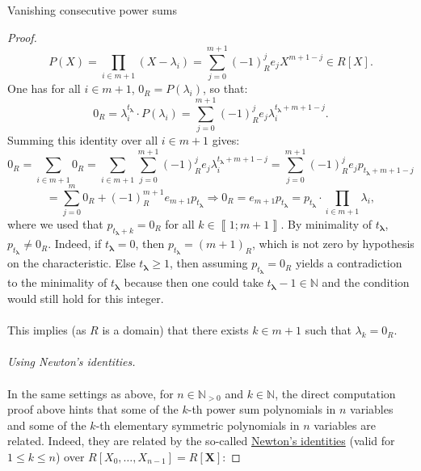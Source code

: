 \begin{appendixitem}{Vanishing consecutive power sums}
\begin{proof}
        \[
            P\left(X\right) = \prod_{i \in m+1} \left(X - \lambda_i\right) = \sum_{j=0}^{m+1} \left(-1\right)_R^j e_j X^{m+1-j} \in R\left[X\right].
        \]
        One has for all \( i \in m+1 \), \( 0_{R} = P\left(\lambda_i\right) \), so that:
        \[
            0_{R} = \lambda_i^{t_{\boldsymbol{\lambda}}} \cdot P\left(\lambda_i\right) = \sum_{j=0}^{m+1} \left(-1\right)_R^j e_j \lambda_i^{t_{\boldsymbol{\lambda}}+m+1-j}.
        \]
        Summing this identity over all \( i \in m+1 \) gives:
        \[
            0_{R} = \sum_{i \in m+1} 0_{R} = \sum_{i \in m+1}\sum_{j=0}^{m+1} \left(-1\right)_R^j e_j \lambda_i^{t_{\boldsymbol{\lambda}}+m+1-j} = \sum_{j=0}^{m+1} \left(-1\right)_R^j e_j p_{t_{\boldsymbol{\lambda}}+m+1-j}
        \]
        \[
            = \sum_{j=0}^{m} 0_{R} + \left(-1\right)_R^{m+1} e_{m+1} p_{t_{\boldsymbol{\lambda}}} \Rightarrow 0_{R} = e_{m+1} p_{t_{\boldsymbol{\lambda}}} = p_{t_{\boldsymbol{\lambda}}} \cdot \prod_{i \in m+1} \lambda_i,
        \]
        where we used that \( p_{t_{\boldsymbol{\lambda}}+k} = 0_{R} \) for all \( k \in \left\llbracket 1;m+1 \right\rrbracket \). By minimality of \( t_{\boldsymbol{\lambda}} \), \( p_{t_{\boldsymbol{\lambda}}} \neq 0_{R} \). Indeed, if \( t_{\boldsymbol{\lambda}} = 0 \), then \( p_{t_{\boldsymbol{\lambda}}} = \left(m+1\right)_{R} \), which is not zero by hypothesis on the characteristic. Else \( t_{\boldsymbol{\lambda}} \geq 1 \), then assuming \( p_{t_{\boldsymbol{\lambda}}} = 0_{R} \) yields a contradiction to the minimality of \( t_{\boldsymbol{\lambda}} \) because then one could take \( t_{\boldsymbol{\lambda}}-1 \in \mathbb{N} \) and the condition would still hold for this integer.
        \\\\
        This implies (as \( R \) is a domain) that there exists \( k \in m+1 \) such that \( \lambda_k = 0_{R} \).
        \\\\
        \textit{Using Newton's identities.}
        \\\\
        In the same settings as above, for \( n \in \mathbb{N}_{>0} \) and \( k \in \mathbb{N} \), the direct computation proof above hints that some of the \( k \)-th power sum polynomials in \( n \) variables and some of the \( k \)-th elementary symmetric polynomials in \( n \) variables are related. Indeed, they are related by the so-called \href{https://en.wikipedia.org/wiki/Newton%27s_identities}{Newton's identities} (valid for \( 1\leq k \leq n \)) over \( R\left[X_0,\dots,X_{n-1}\right] = R\left[\mathbf{X}\right] \):

\end{proof}
\end{appendixitem}
